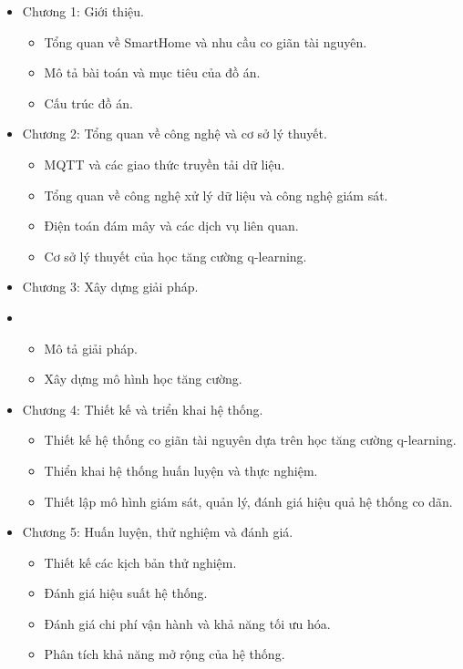 \begin{itemize}
    \item Chương 1: Giới thiệu.
          \begin{itemize}
              \item Tổng quan về SmartHome và nhu cầu co giãn tài nguyên.
              \item Mô tả bài toán và mục tiêu của đồ án.
              \item Cấu trúc đồ án.
          \end{itemize}

    \item Chương 2: Tổng quan về công nghệ và cơ sở lý thuyết.
          \begin{itemize}
              \item MQTT và các giao thức truyền tải dữ liệu.
              \item Tổng quan về công nghệ xử lý dữ liệu và công nghệ giám sát.
              \item Điện toán đám mây và các dịch vụ liên quan.
              \item Cơ sở lý thuyết của học tăng cường q-learning.
          \end{itemize}

    \item Chương 3: Xây dựng giải pháp.
    \item \begin{itemize}
              \item Mô tả giải pháp.
              \item Xây dựng mô hình học tăng cường.
          \end{itemize}

    \item Chương 4: Thiết kế và triển khai hệ thống.
          \begin{itemize}
              \item Thiết kế hệ thống co giãn tài nguyên dựa trên học tăng cường q-learning.
              \item Thiển khai hệ thống huấn luyện và thực nghiệm.
              \item Thiết lập mô hình giám sát, quản lý, đánh giá hiệu quả hệ thống co dãn.
          \end{itemize}

    \item Chương 5: Huấn luyện, thử nghiệm và đánh giá.
          \begin{itemize}
              \item Thiết kế các kịch bản thử nghiệm.
              \item Đánh giá hiệu suất hệ thống.
              \item Đánh giá chi phí vận hành và khả năng tối ưu hóa.
              \item Phân tích khả năng mở rộng của hệ thống.
          \end{itemize}


\end{itemize}
